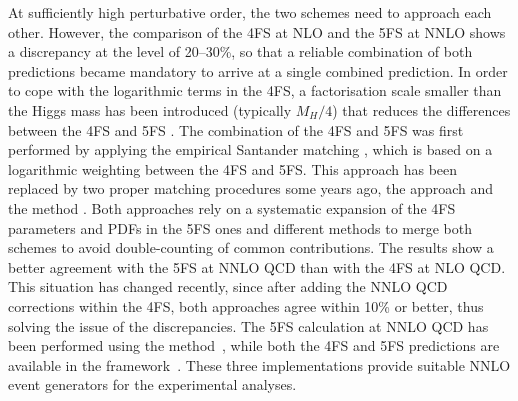 \documentclass[11pt,a4paper]{article}
\begin{document}
At sufficiently high perturbative order, the two schemes need to approach each other. However, the comparison of the 4FS at NLO and the 5FS at NNLO shows a discrepancy at the level of 20--30\%, so that a reliable combination of both predictions became mandatory to arrive at a single combined prediction. In order to cope with the logarithmic terms in the 4FS, a factorisation scale smaller than the Higgs mass has been introduced (typically $M_H/4$) that reduces the differences between the 4FS and 5FS \cite{campbell2004,Maltoni:2012pa}. The combination of the 4FS and 5FS was first performed by applying the empirical Santander matching \cite{harlander:2011aa}, which is based on a logarithmic weighting between the 4FS and 5FS. This approach has been replaced by two proper matching procedures some years ago, the \fonll{} approach \cite{forte:2015hba,forte:2016sja} and the \nlonnllpart{} method \cite{Bonvini:2015pxa,Bonvini:2016fgf}. Both approaches rely on a systematic expansion of the 4FS parameters and PDFs in the 5FS ones and different methods to merge both schemes to avoid double-counting of common contributions. The results show a better agreement with the 5FS at NNLO QCD than with the 4FS at NLO QCD. This situation has changed recently, since after adding the NNLO QCD corrections within the 4FS, both approaches agree within 10\% or better, thus solving the issue of the discrepancies. The 5FS calculation at NNLO QCD has been performed using the \GENEVA{} method~\cite{Gavardi:2025zpf}, while both the 4FS and 5FS predictions are available in the \minnlo{} framework~\cite{Biello:2024pgo,Biello:2024vdh}. These three implementations provide suitable NNLO event generators for the experimental analyses.
\end{document}
